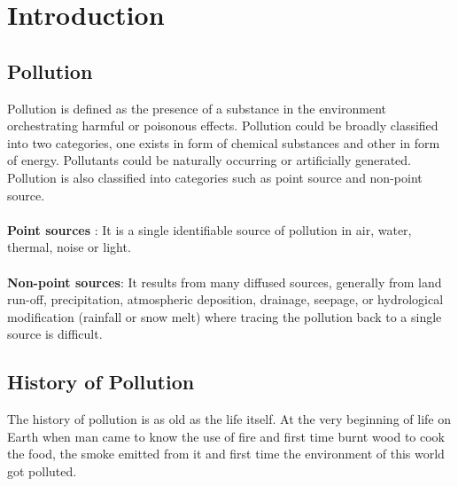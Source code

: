 \chapter{Introduction} %

\label{Chapter1} %




\section{Pollution}

Pollution is defined as the presence of a substance in the environment orchestrating harmful or poisonous effects. Pollution could be broadly classified into two categories, one exists in form of chemical substances and other in form of energy. Pollutants could be naturally occurring or artificially generated. Pollution is also classified into categories such as point source and non-point source.
\\
\\
\textbf{Point sources} : It is a single identifiable source of pollution in air, water, thermal, noise or light. 
\\
\\
\textbf{Non-point sources}: It results from many diffused sources, generally from land run-off, precipitation, atmospheric deposition, drainage, seepage, or hydrological modification (rainfall or snow melt) where tracing the pollution back to a single source is difficult.

\section{History of Pollution}
The history of pollution is as old as the life itself. At the very beginning of life on Earth when man came to know the use of fire and first time burnt wood to cook the food, the smoke emitted from it and first time the environment of this world got polluted.

